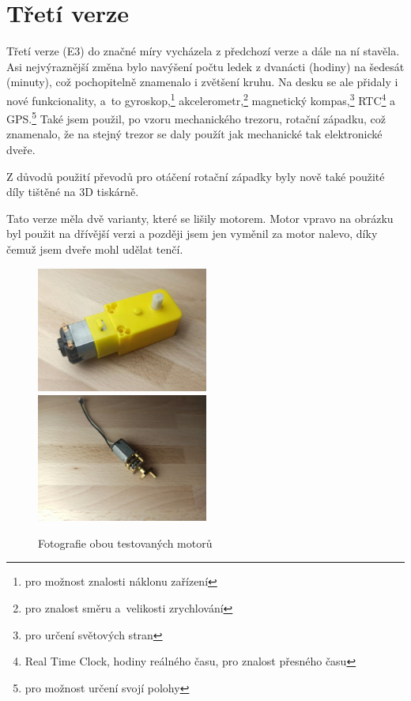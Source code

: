 \section{Třetí verze}
\label{E3-vyvoj}

Třetí verze (E3) do značné míry vycházela z předchozí verze a dále na ní stavěla. Asi nejvýraznější změna bylo navýšení počtu 
ledek z dvanácti (hodiny) na šedesát (minuty), což pochopitelně znamenalo i zvětšení kruhu. Na desku se ale přidaly i nové funkcionality,
a~to gyroskop,\footnote{pro možnost znalosti náklonu zařízení} akcelerometr,\footnote{pro znalost směru a~velikosti zrychlování} magnetický kompas,\footnote{pro určení světových
stran} RTC\footnote{Real Time Clock, hodiny reálného času, pro znalost přesného času} a GPS.\footnote{pro možnost určení svojí polohy}
Také jsem použil, po vzoru mechanického trezoru, rotační západku, což znamenalo, že na stejný trezor se daly použít jak mechanické tak 
elektronické dveře.

Z důvodů použití převodů pro otáčení rotační západky byly nově také použité díly tištěné na 3D tiskárně. 

Tato verze měla dvě varianty, které se lišily motorem.
Motor vpravo na obrázku  byl použit na dřívější verzi a později jsem jen vyměnil za motor nalevo, díky čemuž jsem dveře mohl udělat tenčí. %
\begin{figure}[htbp]
    \centering
    \includegraphics[width=160pt]{kapitoly/obrazky/E3/motory/zluty_motor.jpg}
    \includegraphics[width=160pt]{kapitoly/obrazky/E3/motory/hodinovyStrojek.jpg}
    \caption{Fotografie obou testovaných motorů} 
    \label{fig:E3-motory}
\end{figure}